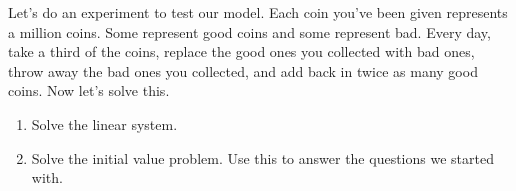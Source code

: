 \documentclass[12pt]{amsart}
\numberwithin{equation}{section}
\theoremstyle{plain} %
\theoremstyle{definition}
\theoremstyle{remark}
\begin{document}
Let's do an experiment to test our model. Each coin you've been given represents a million coins. Some represent good coins and some represent bad. Every day, take a third of the coins, replace the good ones you collected with bad ones, throw away the bad ones you collected, and add back in twice as many good coins.
Now let's solve this.

\begin{enumerate}
\item Solve the linear system.
\item Solve the initial value problem. Use this to answer the questions we started with.
\end{enumerate}
\end{document}
